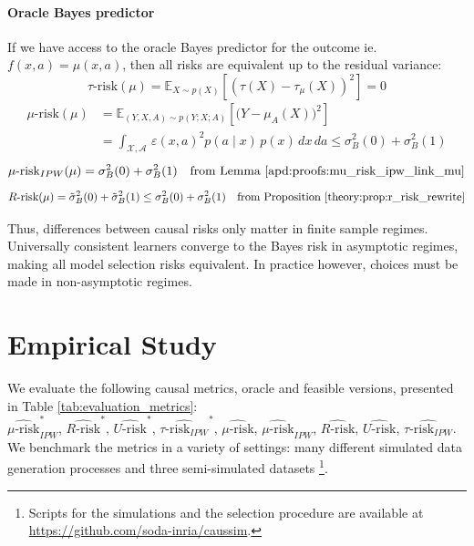 \documentclass[french,12pt,twoside,a4paper]{book}
\begin{document}
\paragraph{Oracle Bayes predictor}\label{remark:bayes_oracle} If we
have access to the oracle Bayes predictor for the outcome ie.~$f(x,
  a)=\mu(x, a)$, then all risks are equivalent up to the residual variance:
\begin{equation}
  \tau\text{-risk}(\mu) = \mathbb E_{X\sim p(X)}[(\tau(X) - \tau_{\mu}(X))^2] = 0
\end{equation}
\begin{align}
  \mu\text{-risk}(\mu) & = \mathbb E_{(Y, X, A) \sim p(Y;X;A)}[\big( Y - \mu_A(X)\big)^2] \\
                       & = \int_{\mathcal X, \mathcal A}
  \,\varepsilon(x,a)^2 p(a \mid x) \,p(x) \,dx\,da  \leq \sigma_B^{2}(0) + \sigma_B^{2}(1)
\end{align}
\begin{equation}
  \mu\text{-risk}_{IPW}(\mu) = \sigma_B^{2}(0) + \sigma_B^{2}(1)  \quad \text{from Lemma \ref{apd:proofs:mu_risk_ipw_link_mu}}
\end{equation}
\begin{equation}
  R\text{-risk}(\mu) = \tilde{\sigma}_B^{2}(0) + \tilde{\sigma}_B^{2}(1)
  \leq \sigma_B^{2}(0) + \sigma_B^{2}(1)  \quad  \text{from Proposition \ref{theory:prop:r_risk_rewrite}}%
\end{equation}

Thus, differences between causal risks only matter in finite sample regimes.
Universally consistent learners converge to the Bayes risk in asymptotic
regimes, making all model selection risks equivalent. In practice however,
choices must be made in non-asymptotic regimes.



\section{Empirical Study}\label{sec:empirical_study}


We evaluate the following causal metrics, oracle and feasible
versions, presented in Table
\ref{tab:evaluation_metrics}:\\
$\widehat{\mu\text{-risk}}_{IPW}^*$,
$\widehat{R\text{-risk}}^*$,
$\widehat{U\text{-risk}}^*$,
$\widehat{\tau\text{-risk}_{IPW}}^*$,
$\widehat{\mu\text{-risk}}$,
$\widehat{\mu\text{-risk}}_{IPW}$,
$\widehat{R\text{-risk}}$,
$\widehat{U\text{-risk}}$,
$\widehat{\tau\text{-risk}_{IPW}}$.
We benchmark the metrics in a variety of settings:
many different simulated data generation
processes and three semi-simulated datasets \footnote{Scripts for the simulations and the selection procedure are available at
  \url{https://github.com/soda-inria/caussim}.
}.
\end{document}
